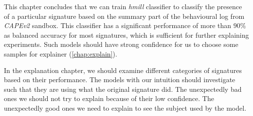This chapter concludes that we can train \emph{hmill} classifier to classify the presence of a particular signature based on the summary part of the behavioural log from \emph{CAPEv2} sandbox. This classifier has a significant performance of more than $90\%$ as balanced accuracy for most signatures, which is sufficient for further explaining experiments. Such models should have strong confidence for us to choose some samples for explainer (\ref{chap:explain}). 


In the explanation chapter, we should examine different categories of signatures based on their performance. The models with our intuition should investigate such that they are using what the original signature did. The unexpectedly bad ones we should not try to explain because of their low confidence. The unexpectedly good ones we need to explain to see the subject used by the model.





